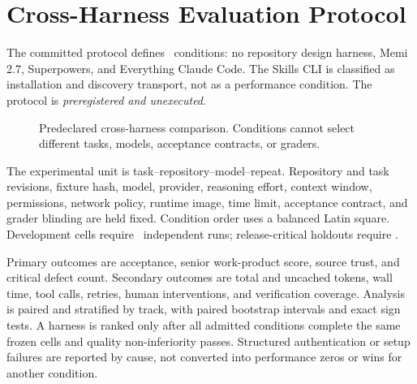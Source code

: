 \documentclass[10pt,twocolumn]{article}
\begin{document}
\section{Cross-Harness Evaluation Protocol}

The committed protocol defines \HarnessConditions\ conditions: no repository
design harness, Memi 2.7, Superpowers, and Everything Claude Code. The Skills
CLI is classified as installation and discovery transport, not as a
performance condition. The protocol is \emph{preregistered and unexecuted}.

\begin{figure}[t]
\centering
{}
\caption{Predeclared cross-harness comparison. Conditions cannot select
different tasks, models, acceptance contracts, or graders.}
\label{fig:crossharness}
\end{figure}

The experimental unit is task--repository--model--repeat. Repository and task
revisions, fixture hash, model, provider, reasoning effort, context window,
permissions, network policy, runtime image, time limit, acceptance contract,
and grader blinding are held fixed. Condition order uses a balanced Latin
square. Development cells require \DevelopmentRepeats\ independent runs;
release-critical holdouts require \ReleaseRepeats.

Primary outcomes are acceptance, senior work-product score, source trust, and
critical defect count. Secondary outcomes are total and uncached tokens, wall
time, tool calls, retries, human interventions, and verification coverage.
Analysis is paired and stratified by track, with paired bootstrap intervals
and exact sign tests. A harness is ranked only after all admitted conditions
complete the same frozen cells and quality non-inferiority passes. Structured
authentication or setup failures are reported by cause, not converted into
performance zeros or wins for another condition.
\end{document}

